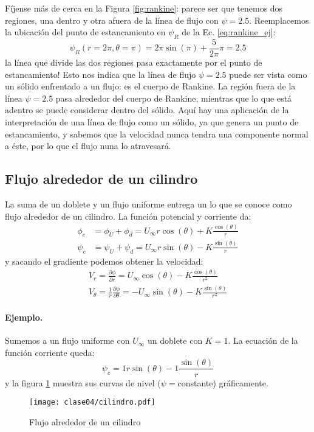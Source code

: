 Fíjense más de cerca en la Figura \ref{fig:rankine}: parece ser que tenemos dos regiones, una dentro y otra afuera de la línea de flujo con $\psi=2.5$. 
Reemplacemos la ubicación del punto de estancamiento en $\psi_R$ de la Ec. \eqref{eq:rankine_ej}:
%
\begin{equation}
\psi_R(r=2\pi,\theta=\pi) = 2\pi\sin(\pi)+\frac{5}{2\pi}\pi = 2.5
\end{equation}
%
la línea que divide las dos regiones pasa exactamente por el punto de estancamiento! 
Esto nos indica que la línea de flujo $\psi=2.5$ puede ser vista como un sólido enfrentado a un flujo: es el cuerpo de Rankine.
La región fuera de la línea $\psi=2.5$ pasa alrededor del cuerpo de Rankine, mientras que lo que está adentro se puede considerar dentro del sólido.
Aquí hay una aplicación de la interpretación de una línea de flujo como un sólido, ya que genera un punto de estancamiento, y sabemos que la velocidad nunca tendra una componente normal a éste, por lo que el flujo nuna lo atravesará.

\subsection*{Flujo alrededor de un cilindro}
La suma de un doblete y un flujo uniforme entrega un lo que se conoce como flujo alrededor de un cilindro.
La función potencial y corriente da:
%
\begin{align}\label{eq:cilindro_pot}
\phi_c &= \phi_U+\phi_d = U_\infty r\cos(\theta) + K\frac{\cos(\theta)}{r}\nonumber\\
\psi_c &= \psi_U+\psi_d = U_\infty r\sin(\theta) - K\frac{\sin(\theta)}{r}
\end{align}
%
y sacando el gradiente podemos obtener la velocidad:
%
\begin{align}\label{eq:cilindro_vel}
V_r = \frac{\partial\phi}{\partial r} = U_\infty\cos(\theta) - K\frac{\cos(\theta)}{r^2} \nonumber\\
V_\theta = \frac{1}{r}\frac{\partial\phi}{\partial\theta} = -U_\infty\sin(\theta) - K\frac{\sin(\theta)}{r^2}
\end{align}

\paragraph{Ejemplo.} 
Sumemos a un flujo uniforme con $U_\infty$ un doblete con $K=1$.
La ecuación de la función corriente queda:
%
\begin{equation}\label{eq:cilindro_ej}
\psi_c =  1 r\sin(\theta) - 1\frac{\sin(\theta)}{r}
\end{equation}
%
y la figura \ref{fig:cilindro} muestra sus curvas de nivel ($\psi=$constante) gráficamente.
%
\begin{figure}[h!]
\centering
\texttt{[image: clase04/cilindro.pdf]}
\caption{Flujo alrededor de un cilindro}
\label{fig:cilindro}
\end{figure}

